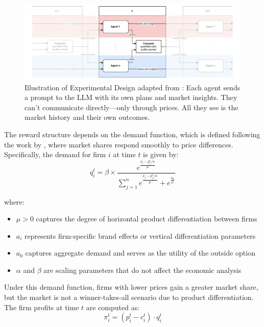 \begin{figure}[H]
  \centering
  \includegraphics[width=1\linewidth]{latex/imgs/illustration_diagram_experiment.pdf}
    \caption{Illustration of Experimental Design adapted from \textcite[p. 9]{fish_algorithmic_2025}: Each agent sends a prompt to the LLM with its own plans and market insights. They can't communicate directly—only through prices. All they see is the market history and their own outcomes.}
    \label{fig:experimental_design}
\end{figure}


The reward structure depends on the demand function, which is defined following the work by \textcite{calvano_artificial_2020}, where market shares respond smoothly to price differences. Specifically, the demand for firm $i$ at time $t$ is given by:
\begin{equation}\label{eq:calvano}
    q_i^t = \beta \times \frac{e^{\frac{a_i - p_i^t/\alpha}{\mu}}}{\sum_{j=1}^{n} e^{\frac{a_j - p_j^t/\alpha}{\mu}} + e^{\frac{a_0}{\mu}}}
\end{equation}

where:
\begin{itemize}
    \item $\mu > 0$ captures the degree of horizontal product differentiation between firms
    \item $a_i$ represents firm-specific brand effects or vertical differentiation parameters
    \item $a_0$ captures aggregate demand and serves as the utility of the outside option
    \item $\alpha$ and $\beta$ are scaling parameters that do not affect the economic analysis
\end{itemize}
Under this demand function, firms with lower prices gain a greater market share, but the market is not a winner-takes-all scenario due to product differentiation. The firm profits at time \( t \) are computed as: 
\begin{equation}
    \pi_i^t = (p_i^t - c_i^t) \cdot q_i^t
\end{equation}

